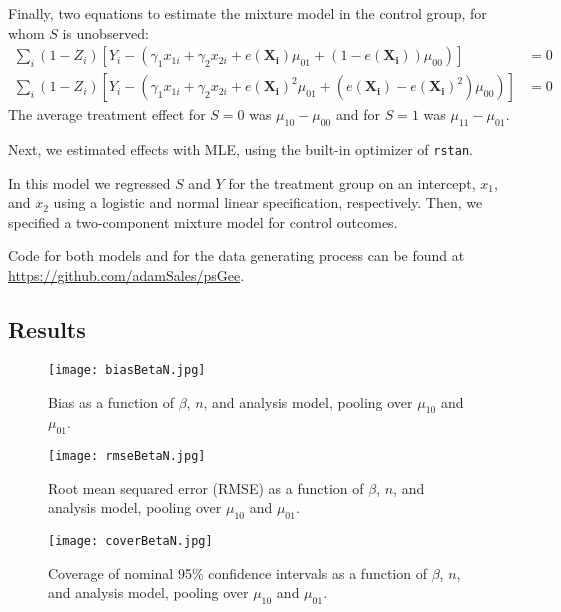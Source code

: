 \documentclass[11pt]{article} %
\newcommand{\ppi}{e(\bm{X_i})}
\begin{document}
Finally, two equations to estimate the mixture model in the control
group, for whom $S$ is unobserved:
\begin{align*}
  \sum_i
  (1-Z_i)\left[Y_i-(\gamma_1x_{1i}+\gamma_2x_{2i}+\ppi\mu_{01}+(1-\ppi)\mu_{00})\right]&=0\\
  \sum_i
  (1-Z_i)\left[Y_i-(\gamma_1x_{1i}+\gamma_2x_{2i}+\ppi^2\mu_{01}+(\ppi-\ppi^2)\mu_{00})\right]&=0
\end{align*}                                                                            
The average treatment effect for $S=0$ was $\mu_{10}-\mu_{00}$ and for
$S=1$ was $\mu_{11}-\mu_{01}$.

Next, we estimated effects with MLE, using the built-in optimizer of
\texttt{rstan}.

In this model we regressed $S$ and $Y$ for the treatment group on an
intercept, $x_1$, and $x_2$ using a logistic and normal linear
specification, respectively.
Then, we specified a two-component mixture model for control
outcomes.

Code for both models and for the data generating process can be found
at \url{https://github.com/adamSales/psGee}.
  
\subsection{Results}

\begin{figure}
  \centering
  \texttt{[image: biasBetaN.jpg]}
  \caption{Bias as a function of $\beta$, $n$, and analysis model,
    pooling over $\mu_{10}$ and $\mu_{01}$.}
  \label{fig:bias}
\end{figure}


\begin{figure}
  \centering
  \texttt{[image: rmseBetaN.jpg]}
  \caption{Root mean sequared error (RMSE) as a function of $\beta$, $n$, and analysis model,
    pooling over $\mu_{10}$ and $\mu_{01}$.}
  \label{fig:rmse}
\end{figure}


\begin{figure}
  \centering
  \texttt{[image: coverBetaN.jpg]}
  \caption{Coverage of nominal 95\% confidence intervals as a function of $\beta$, $n$, and analysis model,
    pooling over $\mu_{10}$ and $\mu_{01}$.}
  \label{fig:coverage}
\end{figure}





\end{document}
